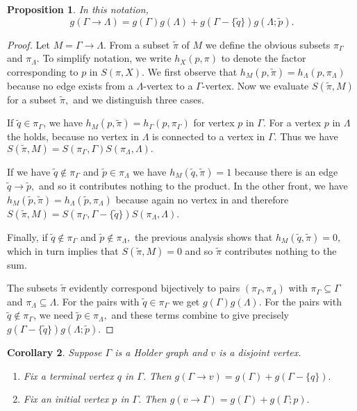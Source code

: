 \documentclass[draft]{article}
\newcommand{\qo}{\tilde{q}}
\newcommand{\pin}{\tilde{p}}
\newcommand{\tilpi}{\tilde{\pi}}
\newcommand{\piga}{\pi_\Gamma}
\newcommand{\pila}{\pi_\Lambda}
\theoremstyle{plain}
\newtheorem{prop}{Proposition}[section]
\newtheorem{cor}[prop]{Corollary}
\theoremstyle{definition}
\begin{document}
\begin{prop}
	In this notation, \eqnspace \begin{equation*} g(\Gamma \rightarrow \Lambda) = g(\Gamma)g(\Lambda) + g(\Gamma - \{\qo\})g(\Lambda; \pin). \end{equation*}
\end{prop}
\begin{proof}
	Let $M = \Gamma \rightarrow \Lambda.$ From a subset $\tilpi$ of $M$ we define the obvious subsets $\piga$ and $\pila.$ To simplify notation, we write $h_X(p, \pi)$ to denote the factor corresponding to $p$ in $S(\pi, X).$ We first observe that $h_M(p, \tilpi) = h_\Lambda(p, \pila)$ because no edge exists from a $\Lambda$-vertex to a $\Gamma$-vertex. Now we evaluate $S(\tilpi, M)$ for a subset $\tilpi,$ and we distinguish three cases.
	
	
	If $\qo \in \piga$, we have $h_M(p, \tilpi) = h_\Gamma(p, \piga)$ for vertex $p$ in $\Gamma$. For a vertex $p$ in $\Lambda$ the holds, because no vertex in $\Lambda$ is connected to a vertex in $\Gamma$. Thus we have $S(\tilpi, M) = S(\piga, \Gamma)S(\pila, \Lambda).$
	
	If we have $\qo\notin\piga$ and $\pin \in \pila$ we have $h_M(\qo, \tilpi) = 1$ because there is an edge $\qo \rightarrow \pin,$ and so it contributes nothing to the product. In the other front, we have $h_M(\pin, \tilpi) = h_\Lambda(\pin, \pila)$ because again no vertex in and therefore $S(\tilpi, M) = S(\piga, \Gamma - \{\qo\})S(\pila, \Lambda)$.
	
	Finally, if $\qo \notin \piga$ and $\pin\notin\pila,$ the previous analysis shows that $h_M(\qo, \tilpi) = 0$, which in turn implies that $S(\tilpi, M) = 0$ and so $\tilpi$ contributes nothing to the sum.
	
	The subsets $\tilpi$ evidently correspond bijectively to pairs $(\piga, \pila)$ with $\piga \subseteq \Gamma$ and $\pila \subseteq \Lambda.$ For the pairs with $\qo \in \piga$ we get $g(\Gamma)g(\Lambda)$. For the pairs with $\qo \notin \piga$, we need $\pin \in \pila,$ and these terms combine to give precisely $g(\Gamma - \{\qo\})g(\Lambda; \pin).$
\end{proof}

\begin{cor} Suppose $\Gamma$ is a Holder graph and $v$ is a disjoint vertex.\listspace
	\begin{enumerate} \listspace
		\item Fix a terminal vertex $q$ in $\Gamma$. Then $g(\Gamma \rightarrow v) = g(\Gamma) + g(\Gamma - \{q\}).$
		\item Fix an initial vertex $p$ in $\Gamma.$ Then $g(v \rightarrow \Gamma) = g(\Gamma) + g(\Gamma; p).$
	\end{enumerate}\textspace
\end{cor}
\end{document}
